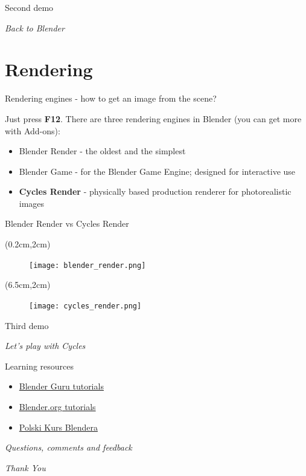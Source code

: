 \documentclass{beamer}
\begin{document}
\begin{frame}{Second demo}

\centering \Huge
\emph{Back to Blender}

\end{frame}

\section{Rendering}

\begin{frame}{Rendering engines - how to get an image from the scene?}

Just press \textbf{F12}. There are three rendering engines in Blender (you can get more with Add-ons):
\begin{itemize}
\item Blender Render - the oldest and the simplest
\item Blender Game - for the Blender Game Engine; designed for interactive use
\item \textbf{Cycles Render} - physically based production renderer for photorealistic images
\end{itemize}

\end{frame}

\begin{frame}{Blender Render vs Cycles Render}

\begin{textblock*}{6cm}(0.2cm,2cm) %
\begin{figure}
\texttt{[image: blender\_render.png]}
\end{figure}
\end{textblock*}

\begin{textblock*}{6cm}(6.5cm,2cm) %
\begin{figure}
\texttt{[image: cycles\_render.png]}
\end{figure}
\end{textblock*}

\end{frame}

\begin{frame}{Third demo}

\centering \Huge
\emph{Let's play with Cycles}

\end{frame}


\begin{frame}{Learning resources}

\begin{itemize}
\item \href{https://www.blenderguru.com/}{Blender Guru tutorials}
\item \href{https://www.blender.org/support/tutorials/}{Blender.org tutorials}
\item \href{http://polskikursblendera.pl/}{Polski Kurs Blendera}
\end{itemize}

\end{frame}

\begin{frame}{}
  \centering \Huge
  \emph{Questions, comments and feedback}
\end{frame}

\begin{frame}{}
  \centering \Huge
  \emph{Thank You}
\end{frame}
\end{document}
